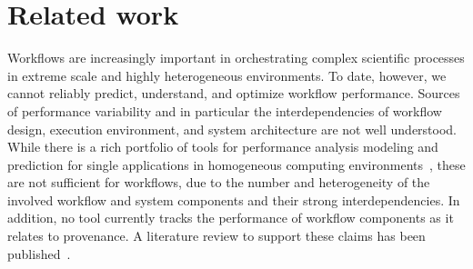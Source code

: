 \section{Related work}

Workflows are increasingly important in orchestrating complex scientific processes in extreme scale and highly heterogeneous environments. To date, however, we cannot reliably predict, understand, and optimize workflow performance. Sources of performance variability and in particular the interdependencies of workflow design, execution environment, and system architecture are not well understood. While there is a rich portfolio of tools for performance analysis modeling and prediction for single applications in homogeneous computing environments~\cite{sonar, TAU, ScoreP, HPCToolkit}, these are not sufficient for workflows, due to the number and heterogeneity of the involved workflow and system components and their strong interdependencies. In addition, no tool currently tracks the performance of workflow components as it relates to provenance. A literature review to support these claims has been published~\cite{kerstin2015design}. 

